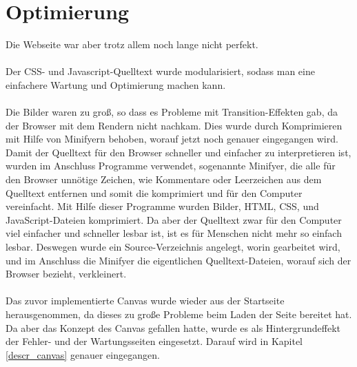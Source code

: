 \section{Optimierung}
Die Webseite war aber trotz allem noch lange nicht perfekt. 
\\
\\
Der CSS- und Javascript-Quelltext wurde modularisiert, sodass man eine einfachere Wartung und Optimierung machen kann.
\\
\\
Die Bilder waren zu groß, so dass es Probleme mit Transition-Effekten gab, da der Browser mit dem Rendern nicht nachkam. Dies wurde durch Komprimieren mit Hilfe von Minifyern behoben, worauf jetzt noch genauer eingegangen wird.
\\
Damit der Quelltext für den Browser schneller und einfacher zu interpretieren ist, wurden im Anschluss Programme verwendet, sogenannte Minifyer, die alle für den Browser unnötige Zeichen, wie Kommentare oder Leerzeichen aus dem Quelltext entfernen und somit die komprimiert und für den Computer vereinfacht. Mit Hilfe dieser Programme wurden Bilder, HTML, CSS, und JavaScript-Dateien komprimiert. Da aber der Quelltext zwar für den Computer viel einfacher und schneller lesbar ist, ist es für Menschen nicht mehr so einfach lesbar. Deswegen wurde ein Source-Verzeichnis angelegt, worin gearbeitet wird, und im Anschluss die Minifyer die eigentlichen Quelltext-Dateien, worauf sich der Browser bezieht, verkleinert. 
\\
\\
Das zuvor implementierte Canvas wurde wieder aus der Startseite herausgenommen, da dieses zu große Probleme beim Laden der Seite bereitet hat. Da aber das Konzept des Canvas gefallen hatte, wurde es als Hintergrundeffekt der Fehler- und der Wartungsseiten eingesetzt. Darauf wird in Kapitel \ref{descr_canvas} genauer eingegangen.
